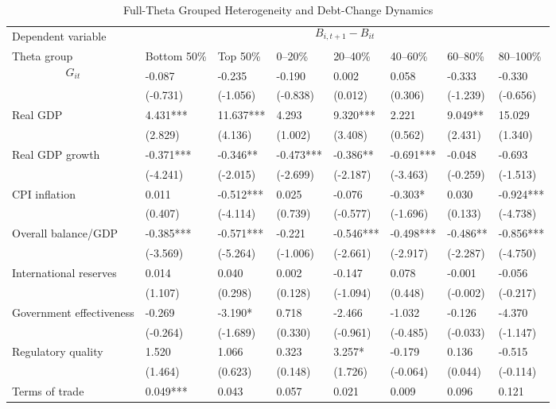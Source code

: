 \begin{table}[H]\centering
\begin{threeparttable}
\caption{Full-Theta Grouped Heterogeneity and Debt-Change Dynamics}
\label{tab:theta_group_heterogeneity_debt}
\scriptsize
\begin{tabularx}{\textwidth}{lYYYYYYY}
\toprule
Dependent variable &  \\
\cmidrule(lr){2-8}
Theta group & Bottom 50\% & Top 50\% & 0--20\% & 20--40\% & 40--60\% & 60--80\% & 80--100\% \\
\midrule
$$G_{it}$$ & -0.087 & -0.235 & -0.190 & 0.002 & 0.058 & -0.333 & -0.330 \\
  & (-0.731) & (-1.056) & (-0.838) & (0.012) & (0.306) & (-1.239) & (-0.656) \\
Real GDP & 4.431*** & 11.637*** & 4.293 & 9.320*** & 2.221 & 9.049** & 15.029 \\
  & (2.829) & (4.136) & (1.002) & (3.408) & (0.562) & (2.431) & (1.340) \\
Real GDP growth & -0.371*** & -0.346** & -0.473*** & -0.386** & -0.691*** & -0.048 & -0.693 \\
  & (-4.241) & (-2.015) & (-2.699) & (-2.187) & (-3.463) & (-0.259) & (-1.513) \\
CPI inflation & 0.011 & -0.512*** & 0.025 & -0.076 & -0.303* & 0.030 & -0.924*** \\
  & (0.407) & (-4.114) & (0.739) & (-0.577) & (-1.696) & (0.133) & (-4.738) \\
Overall balance/GDP & -0.385*** & -0.571*** & -0.221 & -0.546*** & -0.498*** & -0.486** & -0.856*** \\
  & (-3.569) & (-5.264) & (-1.006) & (-2.661) & (-2.917) & (-2.287) & (-4.750) \\
International reserves & 0.014 & 0.040 & 0.002 & -0.147 & 0.078 & -0.001 & -0.056 \\
  & (1.107) & (0.298) & (0.128) & (-1.094) & (0.448) & (-0.002) & (-0.217) \\
Government effectiveness & -0.269 & -3.190* & 0.718 & -2.466 & -1.032 & -0.126 & -4.370 \\
  & (-0.264) & (-1.689) & (0.330) & (-0.961) & (-0.485) & (-0.033) & (-1.147) \\
Regulatory quality & 1.520 & 1.066 & 0.323 & 3.257* & -0.179 & 0.136 & -0.515 \\
  & (1.464) & (0.623) & (0.148) & (1.726) & (-0.064) & (0.044) & (-0.114) \\
Terms of trade & 0.049*** & 0.043 & 0.057 & 0.021 & 0.009 & 0.096 & 0.121 \\

\end{tabularx}
\end{threeparttable}
\end{table}
